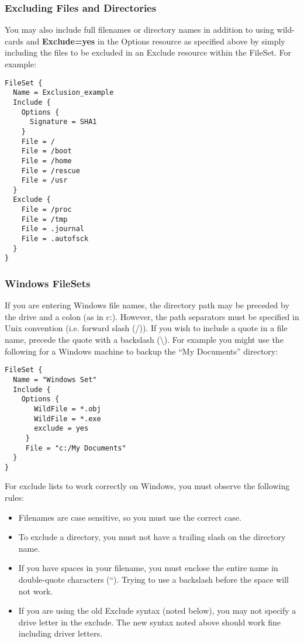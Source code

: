 \subsubsection*{Excluding Files and Directories}

You may also include full filenames or directory names in addition to using
wild-cards and {\bf Exclude=yes} in the Options resource as specified above by
simply including the files to be excluded in an Exclude resource within the
FileSet. For example: 

\footnotesize
\begin{verbatim}
FileSet {
  Name = Exclusion_example
  Include {
    Options {
      Signature = SHA1
    }
    File = /
    File = /boot
    File = /home
    File = /rescue
    File = /usr
  }
  Exclude {
    File = /proc
    File = /tmp
    File = .journal
    File = .autofsck
  }
}
\end{verbatim}
\normalsize

\label{win32}

\subsubsection*{Windows FileSets}
If you are entering Windows file names, the directory path may be preceded by
the drive and a colon (as in c:). However, the path separators must be
specified in Unix convention (i.e. forward slash (/)). If you wish to include
a quote in a file name, precede the quote with a backslash
(\textbackslash{}). For example you might use the following
for a Windows machine to backup the ``My Documents'' directory: 

\footnotesize
\begin{verbatim}
FileSet {
  Name = "Windows Set"
  Include {
    Options {
       WildFile = *.obj
       WildFile = *.exe
       exclude = yes
     }
     File = "c:/My Documents"
  }
}
\end{verbatim}
\normalsize

For exclude lists to work correctly on Windows, you must observe the following
rules: 

\begin{itemize}
\item Filenames are case sensitive, so you must use the correct case.  
\item To exclude a directory, you must not have a trailing slash on the 
   directory name.  
\item If you have spaces in your filename, you must enclose the entire name 
   in double-quote characters (``). Trying to use a backslash before  the space
   will not work.  
\item If you are using the old Exclude syntax (noted below), you may  not
   specify a drive letter in the exclude. The new syntax noted  above should work
   fine including driver letters. 
\end{itemize}

